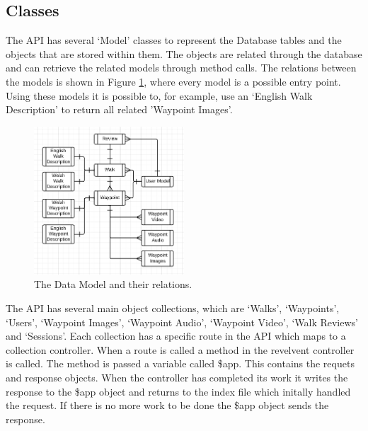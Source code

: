 \documentclass[11pt,a4paper]{report}
\begin{document}
\subsection{Classes}
\label{sec:api:class}
The API has several `Model' classes to represent the Database tables and the objects that are stored within them. The objects are related through the database and can retrieve the related models through method calls. The relations between the models is shown in Figure \ref{fig:datamodels}, where every model is a possible entry point. Using these models it is possible to, for example, use an `English Walk Description' to return all related 'Waypoint Images'. 

\begin{figure}[H]
    \centering
    \includegraphics[width=0.5\textwidth]{DataModels}
    \caption{The Data Model and their relations.}
    \label{fig:datamodels}
\end{figure}

The API has several main object collections, which are `Walks', `Waypoints', `Users', `Waypoint Images', `Waypoint Audio', `Waypoint Video', `Walk Reviews' and `Sessions'. Each collection has a specific route in the API which maps to a collection controller. When a route is called a method in the revelvent controller is called. The method is passed a variable called \$app. This contains the requets and response objects. When the controller has completed its work it writes the response to the \$app object and returns to the index file which initally handled the request. If there is no more work to be done the \$app object sends the response. 
\end{document}
